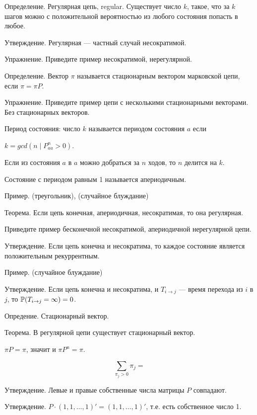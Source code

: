 Определение. Регулярная цепь, regular. Существует число $k$, такое, что за $k$ шагов можно с положительной вероятностью из любого состояния попасть в любое.

Утверждение. Регулярная --- частный случай несократимой. 

Упражнение. Приведите пример несократимой, нерегулярной.



Определение. Вектор $\pi$ называется стационарным вектором марковской цепи, если $\pi=\pi P$.

Упражнение. Приведите пример цепи с несколькими стационарными векторами. Без стационарных векторов.




Период состояния: число $k$ называется периодом состояния $a$ если 

$k=gcd(n\mid P^n_{aa}>0)$. 


Если из состояния $a$ в $a$ можно добраться за $n$ ходов, то $n$ делится на $k$.


Состояние с периодом равным 1 называется апериодичным. 


Пример. (треугольник), (случайное блуждание)



Теорема. Если цепь конечная, апериодичная, несократимая, то она регулярная.

Приведите пример бесконечной несократимой, апериодичной нерегулярной цепи.


Утверждение. Если цепь конечна и несократима, то каждое состояние является положительным рекуррентным.

Пример. (случайное блуждание)


Утверждение. Если цепь конечна и несократима, и $T_{i\to j}$ --- время перехода из $i$ в $j$, то $\P(T_{i\to j}=\infty)=0$.  


Опредение. Стационарный вектор. 


Теорема. В регулярной цепи существует стационарный вектор.


$\pi P=\pi$, значит и $\pi P^n=\pi$.



\begin{equation}
\sum_{\pi_j>0} \pi_j=
\end{equation}


Утверждение. Левые и правые собственные числа матрицы $P$ совпадают.

Утверждение. $P\cdot (1,1,\ldots,1)'=(1,1,\ldots,1)'$, т.е. есть собственное число 1.


